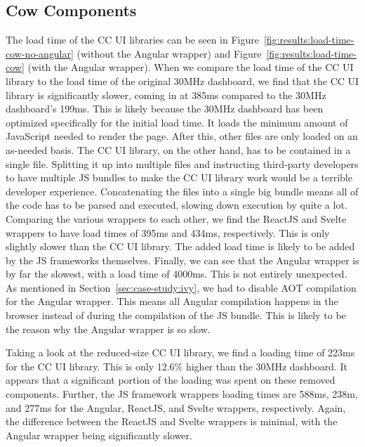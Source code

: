 \subsection{Cow Components}
The load time of the CC UI libraries can be seen in Figure~\ref{fig:results:load-time-cow-no-angular} (without the Angular wrapper) and Figure~\ref{fig:results:load-time-cow} (with the Angular wrapper). When we compare the load time of the CC UI library to the load time of the original 30MHz dashboard, we find that the CC UI library is significantly slower, coming in at 385ms compared to the 30MHz dashboard's 199ms. This is likely because the 30MHz dashboard has been optimized specifically for the initial load time. It loads the minimum amount of JavaScript needed to render the page. After this, other files are only loaded on an as-needed basis. The CC UI library, on the other hand, has to be contained in a single file. Splitting it up into multiple files and instructing third-party developers to have multiple JS bundles to make the CC UI library work would be a terrible developer experience. Concatenating the files into a single big bundle means all of the code has to be parsed and executed, slowing down execution by quite a lot.
Comparing the various wrappers to each other, we find the ReactJS and Svelte wrappers to have load times of 395ms and 434ms, respectively. This is only slightly slower than the CC UI library. The added load time is likely to be added by the JS frameworks themselves. Finally, we can see that the Angular wrapper is by far the slowest, with a load time of 4000ms. This is not entirely unexpected. As mentioned in Section~\ref{sec:case-study:ivy}, we had to disable AOT compilation for the Angular wrapper. This means all Angular compilation happens in the browser instead of during the compilation of the JS bundle. This is likely to be the reason why the Angular wrapper is so slow.

Taking a look at the reduced-size CC UI library, we find a loading time of 223ms for the CC UI library. This is only 12.6\% higher than the 30MHz dashboard. It appears that a significant portion of the loading was spent on these removed components. Further, the JS framework wrappers loading times are 588ms, 238m, and 277ms for the Angular, ReactJS, and Svelte wrappers, respectively. Again, the difference between the ReactJS and Svelte wrappers is minimal, with the Angular wrapper being significantly slower.

